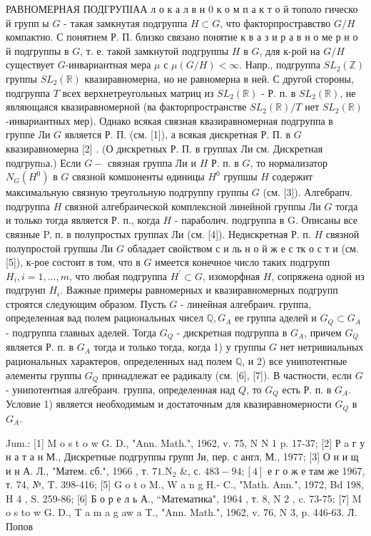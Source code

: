 \documentclass[10pt]{article}
\begin{document}
РАВНОМЕРНАЯ ПОДГРУПIАА л $о$ к а л в н 0 к о м п а к т о й тополо гическо й групп ы $G$ - такая замкнутая подгруппа $H \subset G$, что факторпростравство $G / H$ компактно. С понятием Р. П. близко связано понятие к в а з и р а в н о ме р н о й подгруппы в $G$, т. е. такой замкнутой подгруппы $H$ в $G$, для к-рой на $G / H$ существует $G$-инвариантная мера $\mu$ с $\mu(G / H)<\infty$. Напр., подгруппа $S L_{2}(\mathbb{Z})$ группы $S L_{2}(\mathbb{R})$ квазиравномерна, но не равномерна в ней. С другой стороны, подгруппа $T$ всех верхнетреугольных матриц из $S L_{2}(\mathbb{R})$ - Р. п. в $S L_{2}(\mathbb{R})$, не являющаяся квазиравномерной (ва факторпространстве $S L_{2}(\mathbb{R}) / T$ нет $S L_{2}(\mathbb{R})$-инвариантных мер). Однако всякая связная квазиравномерная подгруппа в группе Ли $G$ является Р. П. (см. [1]), а всякая дискретная Р. П. в $G$ квазиравномерна [2] . (О дискретных Р. П. в группах Ли см. Дискретная подгрупnа.) Если $G-$ связная группа Ли и $H$ Р. п. в $G$, то нормализатор $N_{G}\left(H^{0}\right)$ в $G$ связной комшоненты өдиницы $H^{0}$ групшы $H$ содержит максимальную связную треугольную подгруппу группы $G$ (см. [3]). Алгебрапч. подгруппа $H$ связной алгебраической комплексной линейной группы Ли $G$ тогда и только тогда является Р. п., когда $H$ - параболич. подгруппа в G. Описаны все связные P. п. в полупростых группах Ли (см. [4]). Недискретная Р. п. $H$ связной полупростой групшы Ли $G$ обладает свойством с и ль н о й ж е с тк о с т и (см. [5]), к-рое состоит в том, что в $G$ имеется конечное число таких подгрупп $H_{i}, i=1, \ldots, m$, что любая подгруппа $H^{\prime} \subset G$, изоморфная $H$, сопряжена одной из подгрунп $H_{i}$. Важные примеры равномерных и квазиравномерных подгрупп строятся следующим образом. Пусть $G$ - линейная алгебраич. группа, определенная вад полем рациональных чисел $\mathbb{Q}, G_{A}$ ее группа аделей и $G_{Q} \subset G_{A}$ - подгруппа главных аделей. Тогда $G_{Q}$ - дискретная подгруппа в $G_{A}$, причем $G_{Q}$ является Р. п. в $G_{A}$ тогда и только тогда, когда 1) у группы $G$ нет нетривиальных рациональных характеров, определенных над полем $\mathbb{Q}$, и 2) все унипотентные әлементы группы $G_{Q}$ принадлежат ее радикалу (см. [6], [7]). В частности, если $G$ - унипотентная алгебраич. группа, определенная над $Q$, то $G_{Q}$ есть Р. п. в $G_{A}$. Условие 1) является необходимым и достаточным для квазиравномерности $G_{Q}$ в $G_{A}$.



Jum.: [1] M o s t o w G. D., "Ann. Math.", 1962, v. 75, N N 1 p. 17-37; [2] Р a г у н а т а н М., Дискретные подгруппы групп Ји, пер. с англ, М., 1977; [3] О н и щ и н А. Л., "Матем. сб.", 1966 , т. $71 . \mathrm{N}_{2}$ \&, с. $483-94 ;[4]$ е г о ж е там же 1967, т. 74, №, T. 398-416; [5] G o t o M., W a n g H.- C., "Math. Ann.", 1972, Bd 198, H 4 , S. 259-86; [6] Б о р е л ь А., “Математика", 1964 , т. 8, N 2 , c. 73-75; [7] M o s to w G. D., T a m a g aw a T., "Ann. Math.", 1962, v. 76, N 3, p. 446-63. Л. Попов
\end{document}
